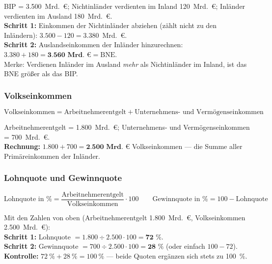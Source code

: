 \documentclass[11pt, a4paper]{article}
\begin{document}
\begin{beispiel}
BIP = 3.500~Mrd.~€; Nichtinländer verdienten im Inland 120~Mrd.~€; Inländer verdienten
im Ausland 180~Mrd.~€.\\[0.3em]
\textbf{Schritt 1:} Einkommen der Nichtinländer abziehen (zählt nicht zu den Inländern):
$3.500 - 120 = 3.380$~Mrd.~€.\\
\textbf{Schritt 2:} Auslandseinkommen der Inländer hinzurechnen:
$3.380 + 180 = \textbf{3.560~Mrd.~€} = \text{BNE}$.\\[0.3em]
Merke: Verdienen Inländer im Ausland \emph{mehr} als Nichtinländer im Inland, ist das
BNE größer als das BIP.
\end{beispiel}

\subsubsection{Volkseinkommen}

\begin{merksatz}[title={\bfseries Formel: Volkseinkommen}]
\[
\text{Volkseinkommen} = \text{Arbeitnehmerentgelt}
+ \text{Unternehmens- und Vermögenseinkommen}
\]
\end{merksatz}

\begin{beispiel}
Arbeitnehmerentgelt = 1.800~Mrd.~€; Unternehmens- und Vermögenseinkommen = 700~Mrd.~€.\\
\textbf{Rechnung:} $1.800 + 700 = \textbf{2.500~Mrd.~€}$ Volkseinkommen ---
die Summe aller Primäreinkommen der Inländer.
\end{beispiel}

\subsubsection{Lohnquote und Gewinnquote}

\begin{merksatz}[title={\bfseries Formeln: Lohnquote und Gewinnquote}]
\[
\text{Lohnquote in \%} = \frac{\text{Arbeitnehmerentgelt}}{\text{Volkseinkommen}} \cdot 100
\qquad
\text{Gewinnquote in \%} = 100 - \text{Lohnquote}
\]
\end{merksatz}

\begin{beispiel}
Mit den Zahlen von oben (Arbeitnehmerentgelt 1.800~Mrd.~€, Volkseinkommen
2.500~Mrd.~€):\\[0.3em]
\textbf{Schritt 1:} Lohnquote $= 1.800 \div 2.500 \cdot 100 = \textbf{72~\%}$.\\
\textbf{Schritt 2:} Gewinnquote $= 700 \div 2.500 \cdot 100 = \textbf{28~\%}$
(oder einfach $100 - 72$).\\
\textbf{Kontrolle:} $72~\% + 28~\% = 100~\%$ --- beide Quoten ergänzen sich stets zu 100~\%.
\end{beispiel}
\end{document}

